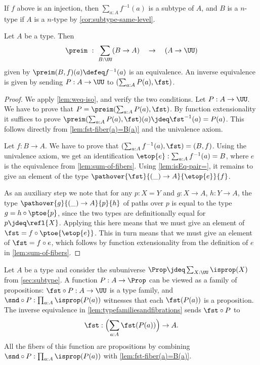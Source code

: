 If $f$ above is an injection, then $\sum_{a:A} f^{-1}(a)$ is a subtype of $A$,
and $B$ is a $n$-type if $A$ is a $n$-type by \cref{cor:subtype-same-level}.

\begin{lemma}\label{lem:typefamiliesandfibrations}
Let $A$ be a type. Then
\[
\preim ~:~ \sum_{B:\UU}(B\to A) \quad\to\quad (A\to\UU)
\]
given by $\preim(B,f)(a)\defeq f^{-1}(a)$ is an equivalence.
An inverse equivalence is given by sending $P:A\to\UU$ to
$(\sum_{a:A}P(a), \fst)$.
\end{lemma}

\begin{proof}
We apply \cref{lem:weq-iso}, and verify the two conditions.
Let $P:A\to\UU$. We have to prove that $P = \preim(\sum_{a:A}P(a), \fst)$.
By function extensionality it suffices to prove
$\preim(\sum_{a:A}P(a), \fst)(a)\jdeq \fst^{-1}(a) = P(a)$.
This follows directly from \cref{lem:fst-fiber(a)=B(a)} and the univalence axiom.

Let $f: B\to A$. We have to prove that $(\sum_{a:A} f^{-1}(a), \fst)=(B,f)$.
Using the univalence axiom, we get an identification
$\etop{e} : \sum_{a:A} f^{-1}(a) = B$, where $e$ is the equivalence
from \cref{lem:sum-of-fibers}. Using \cref{lem:isEq-pair=},
it remains to give an element of the type $\pathover{\fst}{(\_)\to A}{\etop{e}}{f}$.

As an auxiliary step we note that for any $p: X=Y$ and $g:X\to A$,
$h:Y\to A$, the type $\pathover{g}{(\_)\to A}{p}{h}$ of paths over $p$
is equal to the type $g = h\circ{\ptoe{p}}$, since the two
types are definitionally equal for $p\jdeq\refl{X}$.
Applying this here means that we must give an element of
$\fst = f\circ{\ptoe{\etop{e}}}$. This in turn means that
we must give an element of $\fst = f\circ e$,
which follows by function extensionality from the definition
of $e$ in \cref{lem:sum-of-fibers}.
\end{proof}

Let $A$ be a type and consider the subuniverse
$\Prop\jdeq \sum_{X:\UU}\isprop(X)$ from \cref{sec:subtype}.
A function $P: A\to\Prop$ can be viewed as a family of propositions:
$\fst\circ P : A\to \UU$ is a type family, and
$\snd\circ P : \prod_{a:A} \isprop(P(a))$ witnesses
that each $\fst(P(a))$ is a proposition.
The inverse equivalence in \cref{lem:typefamiliesandfibrations}
sends $\fst\circ P$ to
\[
  \fst: \Bigl(\sum_{a:A} \fst(P(a))\Bigr) \to A.
\]
All the fibers of this function are propositions by combining
$\snd\circ P : \prod_{a:A} \isprop(P(a))$
with \cref{lem:fst-fiber(a)=B(a)}.

